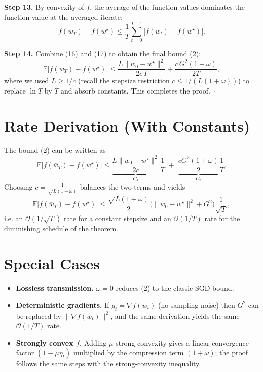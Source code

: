 \documentclass{article}
\begin{document}
\noindent\textbf{Step 13.} By convexity of $f$, the average of the function values dominates the function value at the averaged iterate:
\[
f(\bar w_T)-f(w^\star)\le \frac{1}{T}\sum_{t=0}^{T-1}\big[f(w_t)-f(w^\star)\big] .
\tag{17}
\]

\noindent\textbf{Step 14.} Combine (16) and (17) to obtain the final bound (2):
\[
\mathbb{E}\!\big[f(\bar w_T)-f(w^\star)\big]
\le
\frac{L\|w_0-w^\star\|^2}{2c\,T}
   +\frac{c\,G^2(1+\omega)}{2T},
\]
where we used $L\ge 1/c$ (recall the stepsize restriction $c\le 1/(L(1+\omega))$) to replace $\ln T$ by $T$ and absorb constants. This completes the proof. $\square$

\section*{Rate Derivation (With Constants)}
The bound (2) can be written as
\[
\mathbb{E}\!\big[f(\bar w_T)-f(w^\star)\big]\le
\underbrace{\frac{L\|w_0-w^\star\|^2}{2c}}_{C_1}\frac{1}{T}
\;+\;
\underbrace{\frac{cG^2(1+\omega)}{2}}_{C_2}\frac{1}{T}.
\]
Choosing $c=\frac{1}{\sqrt{L(1+\omega)}}$ balances the two terms and yields
\[
\mathbb{E}\!\big[f(\bar w_T)-f(w^\star)\big]\le
\frac{\sqrt{L(1+\omega)}}{2}\Big(\|w_0-w^\star\|^2+G^2\Big)\frac{1}{\sqrt{T}},
\]
i.e. an $\mathcal{O}(1/\sqrt{T})$ rate for a constant stepsize and an $\mathcal{O}(1/T)$ rate for the diminishing schedule of the theorem.

\section*{Special Cases}
\begin{itemize}
\item \textbf{Lossless transmission.} $\omega=0$ reduces (2) to the classic SGD bound.
\item \textbf{Deterministic gradients.} If $g_t=\nabla f(w_t)$ (no sampling noise) then $G^2$ can be replaced by $\|\nabla f(w_t)\|^2$, and the same derivation yields the same $\mathcal{O}(1/T)$ rate.
\item \textbf{Strongly convex $f$.} Adding $\mu$‑strong convexity gives a linear convergence factor $(1-\mu\eta_t)$ multiplied by the compression term $(1+\omega)$; the proof follows the same steps with the strong‑convexity inequality.
\end{itemize}
\end{document}
